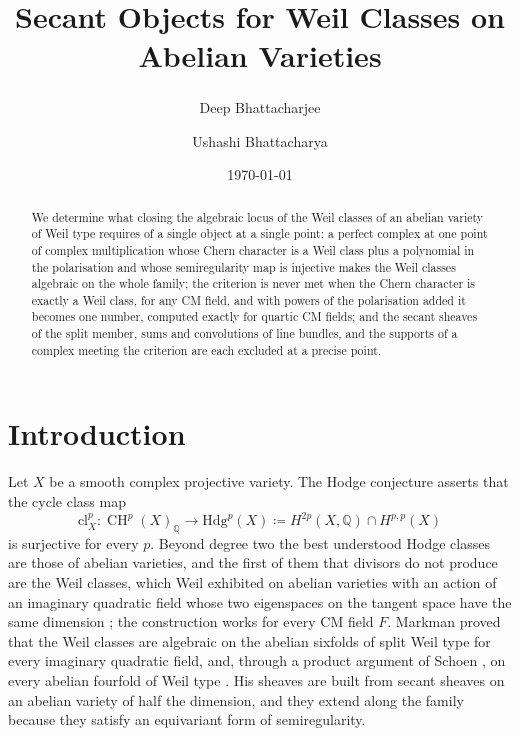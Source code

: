 \documentclass[11pt,reqno]{amsart}
\title[Secant objects for Weil classes]
      {Secant Objects for Weil Classes on Abelian Varieties}
\author{Deep Bhattacharjee\textsuperscript{\dag}}
\author{Ushashi Bhattacharya}
\date{\today}
\theoremstyle{plain}
\theoremstyle{definition}
\theoremstyle{remark}
\newcommand{\QQ}{\mathbb{Q}}
\newcommand{\Hdg}{\mathrm{Hdg}}
\newcommand{\cl}{\mathrm{cl}}
\DeclareMathOperator{\CH}{CH}
\begin{document}
\begin{abstract}
We determine what closing the algebraic locus of the Weil classes of an
abelian variety of Weil type requires of a single object at a single point:
a perfect complex at one point of complex multiplication whose Chern
character is a Weil class plus a polynomial in the polarisation and whose
semiregularity map is injective makes the Weil classes algebraic on the
whole family; the criterion is never met when the Chern character is exactly
a Weil class, for any CM field, and with powers of the polarisation added it
becomes one number, computed exactly for quartic CM fields; and the secant
sheaves of the split member, sums and convolutions of line bundles, and
the supports of a complex meeting the criterion are each excluded at a
precise point.
\end{abstract}

\enlargethispage{6pt}
\maketitle

\setcounter{tocdepth}{1}
\begingroup
\setlength{\parskip}{0pt}
\tableofcontents
\endgroup

\section{Introduction}\label{sec:intro}

Let $X$ be a smooth complex projective variety. The Hodge conjecture asserts
that the cycle class map
\[
  \cl^{p}_{X}\colon \CH^{p}(X)_{\QQ}\longrightarrow \Hdg^{p}(X)
  \coloneqq H^{2p}(X,\QQ)\cap H^{p,p}(X)
\]
is surjective for every $p$. Beyond degree two the best understood Hodge
classes are those of abelian varieties, and the first of them that divisors
do not produce are the Weil classes, which Weil exhibited on abelian
varieties with an action of an imaginary quadratic field whose two
eigenspaces on the tangent space have the same dimension \cite{Weil77}; the
construction works for every CM field $F$. Markman proved that the Weil
classes are algebraic on the abelian sixfolds of split Weil type for every
imaginary quadratic field, and, through a product argument of Schoen
\cite[Proposition~10]{Sch98}, on every abelian fourfold of Weil type
\cite{Mar25a,Mar25b}. His sheaves are built from secant sheaves on an abelian
variety of half the dimension, and they extend along the family because they
satisfy an equivariant form of semiregularity.
\end{document}
